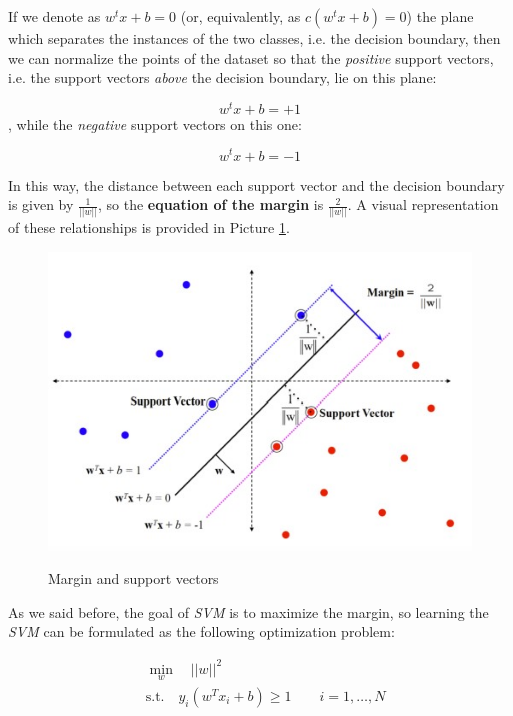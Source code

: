 If we denote as $w^tx + b = 0$ (or, equivalently, as $c(w^tx + b) = 0$) the plane which separates the instances of the two classes, i.e. the decision boundary, then we can normalize the points of the dataset so that the \textit{positive} support vectors, i.e. the support vectors \textit{above} the decision boundary, lie on this plane:

$$
w^tx + b = +1
$$
, while the \textit{negative} support vectors on this one:

$$
w^tx + b = -1
$$

In this way, the distance between each support vector and the decision boundary is given by $\frac{1}{||w||}$, so the \textbf{equation of the margin} is $\frac{2}{||w||}$. A visual representation of these relationships is provided in Picture \ref{margin2}.

\begin{figure}[h!]
		\centering
		\includegraphics[scale = 1.7]{img/margin2.jpg}
        \label{margin2}
        \caption{Margin and support vectors}
\end{figure}

As we said before, the goal of \textit{SVM} is to maximize the margin, so learning the \textit{SVM} can be formulated as the following optimization problem:

\begin{equation}\label{svmopt}
\begin{aligned}
&\min_{w} \quad ||w||^2\\
&\text{s.t.} \quad y_i(w^Tx_i+b) \geq 1 \qquad i = 1,\dots, N\\
\end{aligned}
\end{equation}

